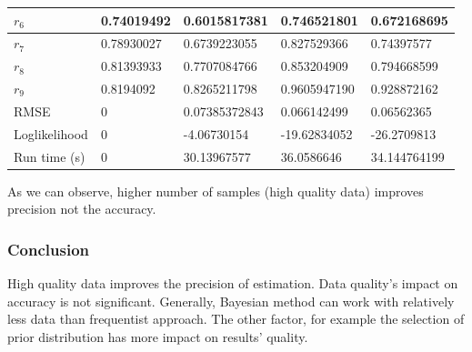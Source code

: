 \documentclass[12pt]{article}
\theoremstyle{definition}
\begin{document}
\begin{table}[]
\begin{tabular}{|l|l|l|l|l|}
$r_6$           & 0.74019492     & 0.6015817381                                                               & 0.746521801                                                                 & 0.672168695                                                                  \\ \hline
$r_7$           & 0.78930027     & 0.6739223055                                                               & 0.827529366                                                                 & 0.74397577                                                                   \\ \hline
$r_8$           & 0.81393933     & 0.7707084766                                                               & 0.853204909                                                                 & 0.794668599                                                                  \\ \hline
$r_9$           & 0.8194092      & 0.8265211798                                                               & 0.9605947190                                                                & 0.928872162                                                                  \\ \hline
RMSE            & 0              & 0.07385372843                                                              & 0.066142499                                                                 & 0.06562365                                                                   \\ \hline
Loglikelihood   & 0              & -4.06730154                                                                & -19.62834052                                                                & -26.2709813                                                                  \\ \hline
Run time (s)    & 0              & {\color[HTML]{232627} 30.13967577}                                         & 36.0586646                                                                  & 34.144764199                                                                 \\ \hline
\end{tabular}
\end{table}
As we can observe, higher number of samples (high quality data) improves
precision not the accuracy. 

\subsubsection{Conclusion}
High quality data improves the precision of estimation. Data quality's impact on
accuracy is not significant. Generally, Bayesian method can work with
relatively less data than frequentist approach. The other factor, for example
the selection of prior distribution has more impact on results' quality.
\end{document}
